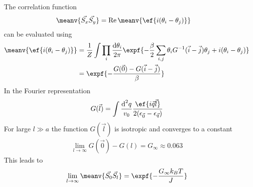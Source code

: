 The correlation function
\begin{align}
\meanv{\vec{S_x} \vec{S_y}} &= \mathop{\text{Re}}\meanv{\ef{i(\theta_i-\theta_j)}}
\end{align}
can be evaluated using
\begin{align}
\meanv{\ef{i(\theta_i-\theta_j)}} &= \frac{1}{Z} \int\prod_{i} \frac{\text{d}\theta_i}{2\pi} \expf{-\frac{\beta}{2} \sum_{i, j} \theta_i G^{-1}(\vec{i}-\vec{j}) \theta_j + i (\theta_i-\theta_j)} \\
&= \expf{-\frac{G(\vec{0})-G(\vec{i}-\vec{j})}{\beta}}
\end{align}
In the Fourier representation
\begin{align}
G(\vec{l})=\int \frac{\text{d}^2q}{v_0} \frac{\ef{i\vec{q}\vec{l}}}{2(\epsilon_{\vec{0}} - \epsilon_{\vec{q}})}
\end{align}
For large $l\gg a$ the function $G(\vec{l})$ is isotropic and converges to a constant
\begin{align}
\lim_{l\rightarrow\infty} G(\vec{0})-G(l) = G_\infty \approx 0.063
\end{align}
This leads to
\begin{align}
\lim_{l\rightarrow\infty}\meanv{\vec{S_0} \vec{S_l}} = \expf{-\frac{G_\infty k_BT}{J}}
\end{align}


